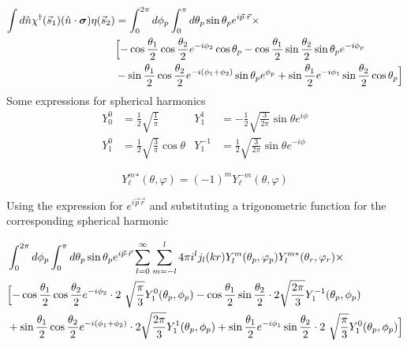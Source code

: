 \documentclass[12pt]{article}
\begin{document}
    \[
	\begin{aligned}
	\int d \hat{n} \chi^{\dagger}(\vec{s}_1)( \hat{n} \cdot \bm{\sigma} )\eta({\vec{s}_2}) &=\int_0^{2 \pi} d \phi_p \int_0^{\pi} d \theta_p \sin \theta_p e^{i \vec{p} \cdot \vec{r}} \times\\
	&\Bigl[-\cos \frac{\theta_1}{2} \cos \frac{\theta_2}{2} e^{-i \phi_2} \cos \theta_p - \cos \frac{\theta_1}{2} \sin \frac{\theta_2}{2}  \sin \theta_p e^{-i \phi_p} \\
    &- \sin \frac{\theta_1}{2} \cos \frac{\theta_2}{2}  e^{-i \left(\phi_1 + \phi_2\right)} \sin \theta_p e^{\phi_p}+ \sin \frac{\theta_1}{2} e^{-i \phi_1} \sin \frac{\theta_2}{2}  \cos \theta_p  \Bigr]
	\end{aligned}
	\]
	Some expressions for spherical harmonics
	\begin{align}
		Y_0^0 &= \frac{1}{2} \sqrt{\frac{1}{\pi}} &  Y_1^1 &= -\frac{1}{2} \sqrt{\frac{3}{2 \pi}} \sin \theta e^{i \phi} \label{eq:first} \\
		Y_1^0 &= \frac{1}{2} \sqrt{\frac{3}{\pi}} \cos \theta & Y_1^{-1}&= \frac{1}{2} \sqrt{\frac{3}{2 \pi}} \sin \theta e^{-i \phi} \label{eq:second}
	\end{align}
	
	\begin{equation}
		Y_{\ell}^{m}{}^{*}(\theta,\varphi) = (-1)^{m}Y_{\ell}^{-m}(\theta,\varphi)
	\end{equation}
	
	 Using the expression for $e^{i \vec{p} \vec{r}}$ and substituting a trigonometric function for the corresponding spherical harmonic
	 
	 \[
	 \begin{aligned}
	 	&\int_0^{2 \pi} d \phi_p \int_0^{\pi} d \theta_p \sin \theta_p e^{i \vec{p} \cdot \vec{r}} \sum_{l=0}^{\infty} \sum_{m=-l}^{l} 4 \pi i^l j_l (kr) Y_{l}^{m}(\theta_p,\varphi_p) Y_{l}^{m*}(\theta_r,\varphi_r) \times \\
	 	&\Bigl[-\cos \frac{\theta_1}{2} \cos \frac{\theta_2}{2} e^{-i \phi_2} \cdot 2 \ \sqrt{\frac{\pi}{3}} Y_1^0(\theta_p, \phi_p) - \cos \frac{\theta_1}{2} \sin \frac{\theta_2}{2} \cdot  2 \sqrt{\frac{2\pi}{3}} Y_1^{-1}(\theta_p, \phi_p) \\
        &+ \sin \frac{\theta_1}{2} \cos \frac{\theta_2}{2}  e^{-i \left(\phi_1 + \phi_2\right)} \cdot 2 \sqrt{\frac{2\pi}{3}} Y_1^{1}(\theta_p, \phi_p) + \sin \frac{\theta_1}{2} e^{-i \phi_1} \sin \frac{\theta_2}{2} \cdot 2 \ \sqrt{\frac{\pi}{3}} Y_1^0(\theta_p, \phi_p)   \Bigr]
	 \end{aligned}
	 \]
\end{document}
